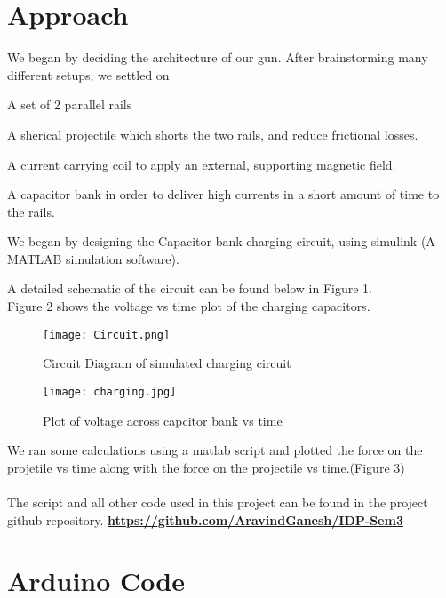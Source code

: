 \documentclass[twoside,twocolumn]{article}
\begin{document}
\section{Approach}
We began by deciding the architecture of our gun.
After brainstorming many different setups, we settled on 

\itemize 
\item A set of 2 parallel rails
\item A sherical projectile which shorts the two rails, and reduce frictional losses.
\item A current carrying coil to apply an external, supporting magnetic field.
\item A capacitor bank in order to deliver high currents in a short amount of time to the rails.
 
	We began by designing the Capacitor bank charging circuit, using simulink (A MATLAB simulation software).

	A detailed schematic of the circuit can be found below in Figure 1.
	\\
	
Figure 2 shows the voltage vs time plot of the charging capacitors.
	
\begin{figure}[htp]
	\caption{Circuit Diagram of simulated charging circuit}
	\texttt{[image: Circuit.png]}
\end{figure}
\newpage	
	
\begin{figure}[h]
	\caption{Plot of voltage across capcitor bank vs time }
	\texttt{[image: charging.jpg]}
\end{figure}
		
	
We ran some calculations using a matlab script and plotted the force on the projetile vs time along with the force on the projectile vs time.(Figure 3)
\\ \\
	The script and all other code used in this project can be found in the project github repository.
\href{https://github.com/AravindGanesh/IDP-Sem3}{\textbf{https://github.com/AravindGanesh/IDP-Sem3}}








\section{Arduino Code}
\end{document}
